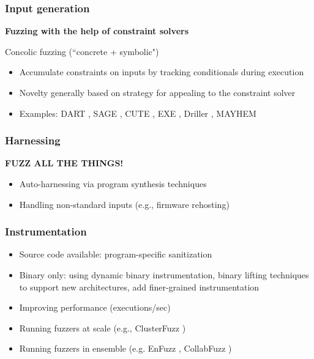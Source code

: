 \documentclass{beamer}
\begin{document}
\begin{frame}
	\frametitle{Input generation}
	\textbf{Fuzzing with the help of constraint solvers} 

	\vspace{\baselineskip}
	Concolic fuzzing (``concrete + symbolic")
	\begin{itemize}
		\item{Accumulate constraints on inputs by tracking conditionals during execution}
		\item{Novelty generally based on strategy for appealing to the constraint solver}
		\item{Examples: DART \cite{dart}, SAGE \cite{sage}, CUTE \cite{cute}, EXE \cite{exe}, Driller \cite{driller}, MAYHEM \cite{mayhem}}

	\end{itemize}


\end{frame}

\begin{frame}
	\frametitle{Harnessing}
	\textbf{FUZZ ALL THE THINGS!}

	\begin{itemize}
		\item{Auto-harnessing via program synthesis techniques}
		\item{Handling non-standard inputs (e.g., firmware rehosting)}
	\end{itemize}

\end{frame}

\begin{frame}
	\frametitle{Instrumentation}

	\begin{itemize}
		\item{Source code available: program-specific sanitization}
		\item{Binary only: using dynamic binary instrumentation, binary lifting techniques to support new architectures, add finer-grained instrumentation}
		\item{Improving performance (executions/sec)} %
		\item{Running fuzzers at scale (e.g., ClusterFuzz \cite{clusterfuzz})}
		\item{Running fuzzers in ensemble (e.g. EnFuzz \cite{enfuzz}, CollabFuzz \cite{collabfuzz})}
		
	\end{itemize}

\end{frame}
\end{document}
